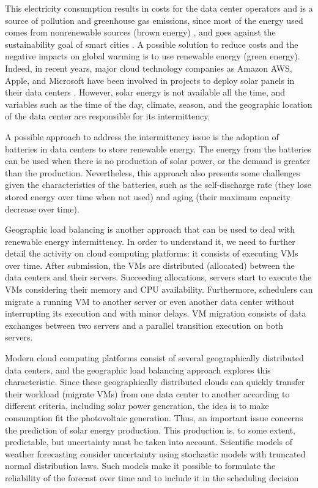 \documentclass[12pt,a4paper]{article}
\begin{document}
This electricity consumption results in costs for the data center operators and is a source of pollution and greenhouse gas emissions, since most of the energy used comes from nonrenewable sources (brown energy) \citep{Greenpeace}, and goes against the sustainability goal of smart cities \citep{smart_cities_n_future_internet}.  A possible solution to reduce costs and the negative impacts on global warming is to use renewable energy (green energy). Indeed, in recent years, major cloud technology companies as Amazon AWS, Apple, and Microsoft have been involved in projects to deploy solar panels in their data centers \citep{Greenpeace}. However, solar energy is not available all the time, and variables such as the time of the day, climate, season, and the geographic location of the data center are responsible for its intermittency.

A possible approach to address the intermittency issue is the adoption of batteries in data centers to store renewable energy. The energy from the batteries can be used when there is no production of solar power, or the demand is greater than the production. Nevertheless, this approach also presents some challenges given the characteristics of the batteries, such as the self-discharge rate (they lose stored energy over time when not used) and aging (their maximum capacity decrease over time).

Geographic load balancing is another approach that can be used to deal with renewable energy intermittency. In order to understand it, we need to further detail the activity on cloud computing platforms: it consists of executing VMs over time. After submission, the VMs are distributed (allocated) between the data centers and their servers. Succeeding allocations, servers start to execute the VMs considering their memory and CPU availability. Furthermore, schedulers can migrate a running VM to another server or even another data center without interrupting its execution and with minor delays. VM migration consists of data exchanges between two servers and a parallel transition execution on both servers.

Modern cloud computing platforms consist of several geographically distributed data centers, and the geographic load balancing approach explores this characteristic. Since these geographically distributed clouds can quickly transfer their workload (migrate VMs) from one data center to another according to different criteria, including solar power generation, the idea is to make consumption fit the photovoltaic generation. Thus, an important issue concerns the prediction of solar energy production. This production is, to some extent, predictable, but uncertainty must be taken into account. Scientific models of weather forecasting consider uncertainty using stochastic models with truncated normal distribution laws. Such models make it possible to formulate the reliability of the forecast over time and to include it in the scheduling decision
\end{document}
